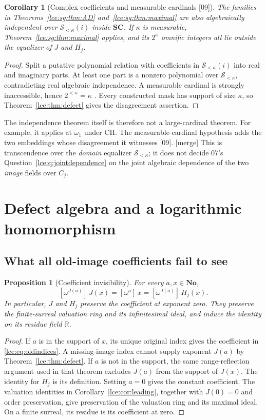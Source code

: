 \documentclass[11pt,letterpaper]{article}
\numberwithin{equation}{section}
\newtheorem{proposition}[theorem]{Proposition}
\newtheorem{corollary}[theorem]{Corollary}
\theoremstyle{definition}
\theoremstyle{remark}
\newcommand{\No}{\mathbf{No}}
\newcommand{\SC}{\mathbf{SC}}
\newcommand{\R}{\mathbb R}
\newcommand{\Sk}{\mathscr S_{<\kappa}}
\newcommand{\Common}{C_j}
\newcommand{\coef}[2]{[\omega^{#1}]\,#2}
\newcommand{\thref}[1]{Theorem~\ref{#1}}
\newcommand{\src}[1]{\textup{\textsf{\small[#1]}}}%
\newcommand{\mergetag}{\textup{\textsf{\small[merge]}}}%
\begin{document}
\begin{corollary}[Complex coefficients and measurable cardinals \src{09}]
\label{lce:sg:cor:combined}
The families in Theorems~\ref{lce:sg:thm:AD} and~\ref{lce:sg:thm:maximal}
are also algebraically independent over $\Sk(i)$ inside $\SC$. If $\kappa$ is
measurable, \thref{lce:sg:thm:maximal} applies, and its $2^\kappa$ omnific
integers all lie outside the equalizer of $J$ and $H_j$.
\end{corollary}
\begin{proof}
Split a putative polynomial relation with coefficients in $\Sk(i)$ into
real and imaginary parts. At least one part is a nonzero polynomial over
$\Sk$, contradicting real algebraic independence. A measurable cardinal is
strongly inaccessible, hence $2^{<\kappa}=\kappa$ \cite{Kanamori}. Every
constructed mask has support of size $\kappa$, so \thref{lce:thm:defect}
gives the disagreement assertion.
\end{proof}
The independence theorem itself is therefore not a large-cardinal theorem.
For example, it applies at $\omega_1$ under CH. The measurable-cardinal
hypothesis adds the two embeddings whose disagreement it witnesses \src{09}.
\mergetag{} This is transcendence over the \emph{domain} equalizer $\Sk$; it
does not decide 07's Question~\ref{lce:q:jointdependence} on the joint
algebraic dependence of the two \emph{image} fields over $\Common$.

\section{Defect algebra and a logarithmic homomorphism}\label{lce:sec:log}

\subsection{What all old-image coefficients fail to see}
\begin{proposition}[Coefficient invisibility]\label{lce:prop:invisible}
For every $a,x\in\No$,
\begin{equation}\label{lce:eq:oldcoeff}
 \coef{J(a)}{J(x)}=\coef{a}{x}=\coef{J(a)}{H_j(x)}.
\end{equation}
In particular, $J$ and $H_j$ preserve the coefficient at exponent zero.
They preserve the finite-surreal valuation ring and its infinitesimal
ideal, and induce the identity on its residue field $\R$.
\end{proposition}
\begin{proof}
If $a$ is in the support of $x$, its unique original index gives the
coefficient in \eqref{lce:eq:oldindices}. A missing-image index cannot supply
exponent $J(a)$ by \thref{lce:thm:defect}. If $a$ is not in the support, the
same range-reflection argument used in that theorem excludes $J(a)$ from
the support of $J(x)$. The identity for $H_j$ is its definition.
Setting $a=0$ gives the constant coefficient. The valuation identities
in Corollary~\ref{lce:cor:leading}, together with $J(0)=0$ and order
preservation, give preservation of the valuation ring and its maximal
ideal. On a finite surreal, its residue is its coefficient at zero.
\end{proof}
\end{document}
